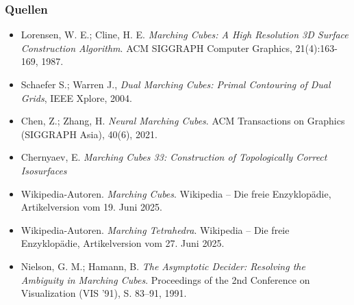 \documentclass{beamer}
\begin{document}
\begin{frame}[t]
\frametitle{Quellen}
\scriptsize
\begin{itemize}
\item Lorensen, W. E.; Cline, H. E. \emph{Marching Cubes: A High Resolution 3D Surface Construction Algorithm}. ACM SIGGRAPH Computer Graphics, 21(4):163-169, 1987.
\item Schaefer S.; Warren J., \emph{Dual Marching Cubes: Primal Contouring of Dual Grids}, IEEE Xplore, 2004.
\item Chen, Z.; Zhang, H. \emph{Neural Marching Cubes}. ACM Transactions on Graphics (SIGGRAPH Asia), 40(6), 2021.
\item Chernyaev, E. \emph{Marching Cubes 33: Construction of Topologically Correct Isosurfaces}
\item Wikipedia-Autoren. \emph{Marching Cubes}. Wikipedia – Die freie Enzyklopädie, Artikelversion vom 19. Juni 2025.
\item Wikipedia-Autoren. \emph{Marching Tetrahedra}. Wikipedia – Die freie Enzyklopädie, Artikelversion vom 27. Juni 2025.\\
\item Nielson, G. M.; Hamann, B. \emph{The Asymptotic Decider: Resolving the Ambiguity in Marching Cubes}. Proceedings of the 2nd Conference on Visualization (VIS '91), S. 83–91, 1991.
\end{itemize}
\end{frame}
\end{document}

